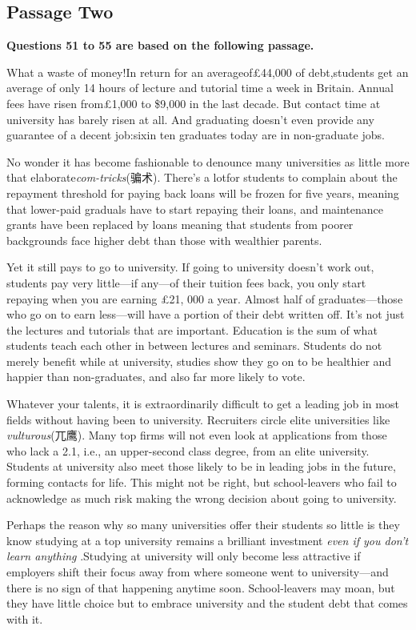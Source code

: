 \documentclass[UTF8,11pt]{ctexart}
\begin{document}
\subsection*{\textbf{Passage Two}}


\textbf{Questions 51 to 55 are based on the following passage.}


What a waste of money!In return for an averageof£44,000 of debt,students get an average of only 14 hours of lecture and tutorial time a week in Britain. Annual fees have risen from£1,000 to \$9,000 in the last decade. But contact time at university has barely risen at all. And graduating doesn’t even provide any guarantee of a decent job:sixin ten graduates today are in non-graduate jobs.


No wonder it has become fashionable to denounce many universities as little more that elaborate\textit{com-tricks}(骗术). There’s a lotfor students to complain about the repayment threshold for paying back loans will be frozen for five years, meaning that lower-paid graduals have to start repaying their loans, and maintenance grants have been replaced by loans meaning that students from poorer backgrounds face higher debt than those with wealthier parents.


Yet it still pays to go to university. If going to university doesn’t work out, students pay very little—if any—of their tuition fees back, you only start repaying when you are earning £21, 000 a year. Almost half of graduates—those who go on to earn less—will have a portion of their debt written off. It’s not just the lectures and tutorials that are important. Education is the sum of what students teach each other in between lectures and seminars. Students do not merely benefit while at university, studies show they go on to be healthier and happier than non-graduates, and also far more likely to vote.


Whatever your talents, it is extraordinarily difficult to get a leading job in most fields without having been to university. Recruiters circle elite universities like\textit{ vulturous}(兀鹰). Many top firms will not even look at applications from those who lack a 2.1, i.e., an upper-second class degree, from an elite university. Students at university also meet those likely to be in leading jobs in the future, forming contacts for life. This might not be right, but school-leavers who fail to acknowledge as much risk making the wrong decision about going to university.


Perhaps the reason why so many universities offer their students so little is they know studying at a top university remains a brilliant investment\textit{ even if you don’t learn anything} .Studying at university will only become less attractive if employers shift their focus away from where someone went to university—and there is no sign of that happening anytime soon. School-leavers may moan, but they have little choice but to embrace university and the student debt that comes with it.
\end{document}
